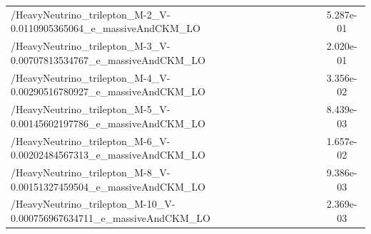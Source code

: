 \begin{table}[h]
\begin{center}
{\begin{tabular}{|l|c|}
        /HeavyNeutrino\_trilepton\_M-2\_V-0.0110905365064\_e\_massiveAndCKM\_LO  & 5.287e-01 \\ 
        /HeavyNeutrino\_trilepton\_M-3\_V-0.00707813534767\_e\_massiveAndCKM\_LO  & 2.020e-01 \\ 
        /HeavyNeutrino\_trilepton\_M-4\_V-0.00290516780927\_e\_massiveAndCKM\_LO  & 3.356e-02 \\ 
        /HeavyNeutrino\_trilepton\_M-5\_V-0.00145602197786\_e\_massiveAndCKM\_LO  & 8.439e-03 \\
        /HeavyNeutrino\_trilepton\_M-6\_V-0.00202484567313\_e\_massiveAndCKM\_LO  & 1.657e-02 \\
        /HeavyNeutrino\_trilepton\_M-8\_V-0.00151327459504\_e\_massiveAndCKM\_LO  & 9.386e-03  \\
        /HeavyNeutrino\_trilepton\_M-10\_V-0.000756967634711\_e\_massiveAndCKM\_LO & 2.369e-03 \\
      \hline
    \end{tabular}}    
  \end{center}
\end{table}

\begin{table}[h]
  \begin{center}
    \caption{\label{tab:SamplesSignalTau} Simulated samples of HNL
      production and decay to three charged leptons and a neutrino, in
      scenarios where the HNL mixes exclusively with $\tau$
      neutrinos. Each event contains one, two or three $\tau$ leptons,
      which are allowed to decay either hadronically or leptonically. \textbf{the $\tau$ coupling samples are not used in this analysis}, they are for reference and future prospects.}
  \end{center}
\end{table}

